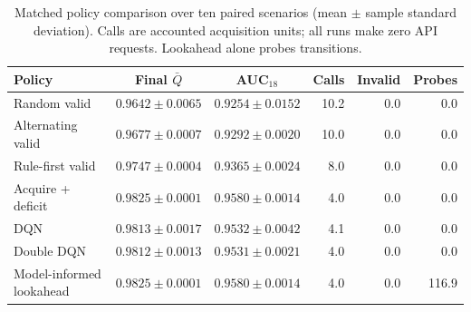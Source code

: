 \begin{table}[t]
\centering
\caption{Matched policy comparison over ten paired scenarios (mean $\pm$ sample standard deviation). Calls are accounted acquisition units; all runs make zero API requests. Lookahead alone probes transitions.}
\label{tab:rl_ablation}
\footnotesize
\setlength{\tabcolsep}{3pt}
\begin{tabular*}{\textwidth}{@{\extracolsep{\fill}}lccrrr@{}}
\toprule
Policy & Final $\bar Q$ & AUC$_{18}$ & Calls & Invalid & Probes \\
\midrule
Random valid & $0.9642\pm0.0065$ & $0.9254\pm0.0152$ & 10.2 & 0.0 & 0.0 \\
Alternating valid & $0.9677\pm0.0007$ & $0.9292\pm0.0020$ & 10.0 & 0.0 & 0.0 \\
Rule-first valid & $0.9747\pm0.0004$ & $0.9365\pm0.0024$ & 8.0 & 0.0 & 0.0 \\
Acquire + deficit & $0.9825\pm0.0001$ & $0.9580\pm0.0014$ & 4.0 & 0.0 & 0.0 \\
DQN & $0.9813\pm0.0017$ & $0.9532\pm0.0042$ & 4.1 & 0.0 & 0.0 \\
Double DQN & $0.9812\pm0.0013$ & $0.9531\pm0.0021$ & 4.0 & 0.0 & 0.0 \\
Model-informed lookahead & $0.9825\pm0.0001$ & $0.9580\pm0.0014$ & 4.0 & 0.0 & 116.9 \\
\bottomrule
\end{tabular*}
\end{table}
